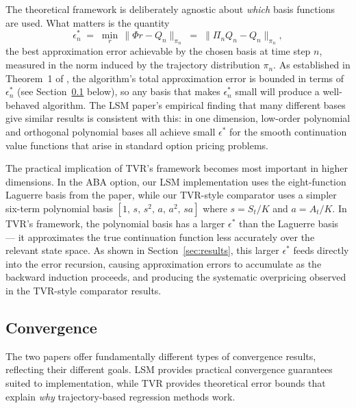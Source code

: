The theoretical framework is deliberately agnostic about \emph{which}
basis functions are used. What matters is the quantity
\begin{equation}
    \epsilon_n^* \;=\; \min_{r}\,
    \bigl\|\Phi r - Q_n\bigr\|_{\pi_n}
    \;=\; \bigl\|\Pi_n Q_n - Q_n\bigr\|_{\pi_n},
    \label{eq:best_approx_error}
\end{equation}
the best approximation error achievable by the chosen basis at time step
$n$, measured in the norm induced by the trajectory distribution $\pi_n$.
As established in Theorem~1 of \citet{tsitsiklis2001}, the algorithm's
total approximation error is bounded in terms of $\epsilon_n^*$ (see
Section~\ref{sec:convergence} below), so any basis that makes $\epsilon_n^*$
small will produce a well-behaved algorithm. The LSM paper's empirical
finding that many different bases give similar results is consistent with
this: in one dimension, low-order polynomial and orthogonal polynomial
bases all achieve small $\epsilon^*$ for the smooth continuation value
functions that arise in standard option pricing problems.

The practical implication of TVR's framework becomes most important in
higher dimensions. In the ABA option, our LSM implementation uses the
eight-function Laguerre basis from the paper, while our TVR-style
comparator uses a simpler six-term polynomial basis
$[1,\, s,\, s^2,\, a,\, a^2,\, sa]$ where $s = S_t/K$ and $a = A_t/K$.
In TVR's framework, the polynomial basis has a larger $\epsilon^*$ than
the Laguerre basis --- it approximates the true continuation function less
accurately over the relevant state space. As shown in
Section~\ref{sec:results}, this larger $\epsilon^*$ feeds directly into
the error recursion, causing approximation errors to accumulate as the
backward induction proceeds, and producing the systematic overpricing
observed in the TVR-style comparator results.

\subsection{Convergence}
\label{sec:convergence}

The two papers offer fundamentally different types of convergence results,
reflecting their different goals. LSM provides practical convergence
guarantees suited to implementation, while TVR provides theoretical error
bounds that explain \emph{why} trajectory-based regression methods work.

